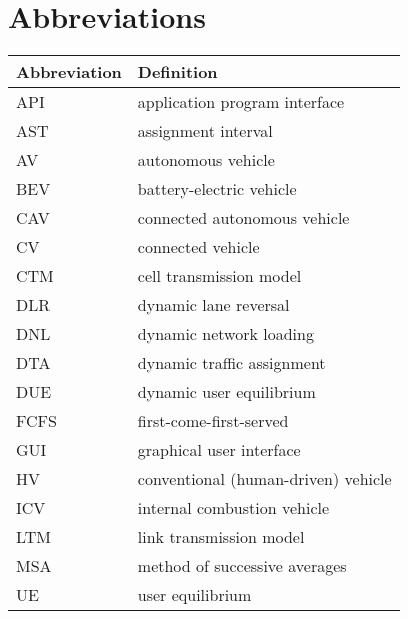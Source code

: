 \chapter{Abbreviations}

\begin{longtable}{ll}
\hline
Abbreviation & Definition\\\hline
\endhead
API & application program interface\\
AST & assignment interval\\
AV & autonomous vehicle\\
BEV & battery-electric vehicle\\
CAV & connected autonomous vehicle\\
CV & connected vehicle \\
CTM &  cell transmission model~\cite{daganzo1994cell, daganzo1995cell}\\
DLR & dynamic lane reversal~\cite{levin2016cell, duell2016system} \\
DNL & dynamic network loading~\cite{chiu2011dynamic} \\
DTA & dynamic traffic assignment~\cite{chiu2011dynamic} \\
DUE & dynamic user equilibrium~\cite{wardrop1952road, chiu2011dynamic} \\
FCFS & first-come-first-served~\cite{fajardo2011automated}\\
GUI & graphical user interface\\
HV & conventional (human-driven) vehicle\\
ICV & internal combustion vehicle\cite{levin2014effect}\\
LTM & link transmission model~\cite{yperman2005link, yperman2007link}\\
MSA & method of successive averages\cite{levin2014improving}\\
UE & user equilibrium~\cite{wardrop1952road}\\
\hline
\end{longtable}